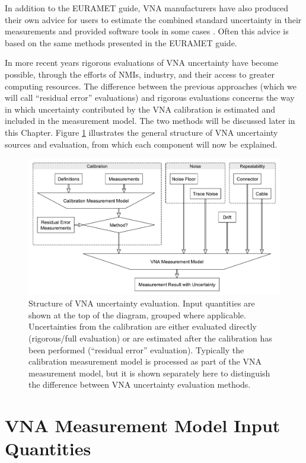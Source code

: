 \documentclass[../thesis/thesis.tex]{subfiles}
\begin{document}
In addition to the EURAMET guide, VNA manufacturers have also produced their own advice for users to estimate the combined standard uncertainty in their measurements \cite{Hiebel_2008} and provided software tools in some cases \cite{KeysightUncTool, AnritsuUncTool, Maury_Insight}. Often this advice is based on the same methods presented in the EURAMET guide.

In more recent years rigorous evaluations of VNA uncertainty have become possible, through the efforts of NMIs, industry, and their access to greater computing resources. The difference between the previous approaches (which we will call ``residual error'' evaluations) and rigorous evaluations concerns the way in which uncertainty contributed by the VNA calibration is estimated and included in the measurement model. The two methods will be discussed later in this Chapter. Figure \ref{ch4_fig_vna_model} illustrates the general structure of VNA uncertainty sources and evaluation, from which each component will now be explained.

\begin{figure}
	\centering
	\includegraphics[width=\textwidth]{vna-model.pdf}
	\caption[Structure of VNA uncertainty evaluation.]{Structure of VNA uncertainty evaluation. Input quantities are shown at the top of the diagram, grouped where applicable. Uncertainties from the calibration are either evaluated directly (rigorous/full evaluation) or are estimated after the calibration has been performed (``residual error'' evaluation). Typically the calibration measurement model is processed as part of the VNA measurement model, but it is shown separately here to distinguish the difference between VNA uncertainty evaluation methods.}
	\label{ch4_fig_vna_model}
\end{figure}

\section{VNA Measurement Model Input Quantities}
\end{document}
